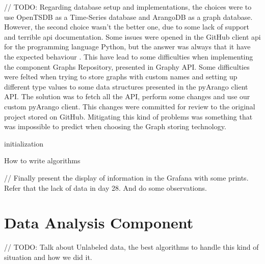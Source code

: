 // TODO: Regarding database setup and implementations, the choices were to use OpenTSDB as a Time-Series database and ArangoDB as a graph database. However, the second choice wasn't the better one, due to some lack of support and terrible \gls{api} documentation. Some issues were opened in the GitHub client \gls{api} for the programming language Python, but the answer was always that it have the expected behaviour \cite{arango_issues}. This have lead to some difficulties when implementing the component Graphs Repository, presented in Graphy API. Some difficulties were felted when trying to store graphs with custom names and setting up different type values to some data structures presented in the pyArango client API. The solution was to fetch all the API, perform some changes and use our custom pyArango client. This changes were committed for review to the original project stored on GitHub. Mitigating this kind of problems was something that was impossible to predict when choosing the Graph storing technology.

\begin{algorithm}[H]
\SetAlgoLined
{}
 initialization\;
 \caption{How to write algorithms}
\end{algorithm}


// Finally present the display of information in the Grafana with some prints. Refer that the lack of data in day 28. And do some observations. 

\section{Data Analysis Component}
\label{sec:data_analysis_component}

// TODO: Talk about Unlabeled data, the best algorithms to handle this kind of situation and how we did it.




\checkoddpage
{}
{ %
\newpage
\blankpage}
{ %
}
